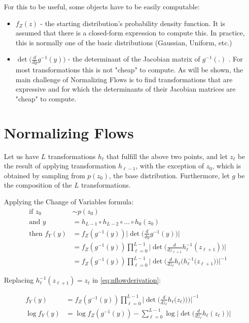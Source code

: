 For this to be useful, some objects have to be easily computable:
\begin{itemize}
    \item $f_Z(z)$ - the starting distribution's probability density function.
        It is assumed that there is a closed-form expression to compute this. In
        practice, this is normally one of the basic distributions (Gaussian,
        Uniform, etc.)
    \item $\det\Big(\frac{d}{dy}g^{-1}(y)\Big)$ - the determinant  of the Jacobian
        matrix of $g^{-1}(.)$ . For most transformations this is not "cheap" to compute.
        As will be shown, the main challenge of Normalizing Flows is to find
        transformations that are expressive and for which 
        the determinants of their Jacobian matrices are "cheap" to compute.
\end{itemize}

\section{Normalizing Flows}
Let us have $L$ transformations $h_\ell$ that fulfill the above two points, and
let $z_\ell$ be the result of applying transformation $h_{\ell-1}$, with the
exception of $z_0$, which is obtained by sampling from $p(z_0)$, the base distribution.
Furthermore, let $g$ be the composition of the $L$ transformations.

Applying the Change of Variables formula:
\begin{align}
    \mbox{if } z_0 &\sim p(z_0) \\
    \mbox{and } y &= h_{L-1} \circ h_{L-2} \circ ... \circ h_0(z_0) \\
    \mbox{then } f_Y(y) &= f_Z(g^{-1}(y))\Big|\det\Big(\frac{d}{dy}g^{-1}(y)\Big)\Big| \\
                        &= f_Z(g^{-1}(y))\prod_{\ell=0}^{L-1}\Big|\det\Big(\frac{d}{dz_{\ell+1}}h_{\ell}^{-1}(z_{\ell+1})\Big)\Big| \\
                        &= f_Z(g^{-1}(y))\prod_{\ell=0}^{L-1}\Big|\det\Big(\frac{d}{dz_{\ell}}h_{\ell}\Big(h_{\ell}^{-1}(z_{\ell+1}\Big)\Big)\Big|^{-1} \label{eq:nflowderivation}
\end{align}

Replacing $h_{\ell}^{-1}(z_{\ell+1}) = z_\ell$ in \ref{eq:nflowderivation}:

\begin{align}
         f_Y(y) &= f_Z(g^{-1}(y))\prod_{\ell=0}^{L-1}\Big|\det\Big(\frac{d}{dz_{\ell}}h_{\ell}\Big(z_\ell)\Big)\Big)\Big|^{-1} \\
    \log f_Y(y) &= \log f_Z(g^{-1}(y)) - \sum_{\ell=0}^{L-1} \log \Big|\det\Big(\frac{d}{dz_{\ell}}h_{\ell}(z_\ell)\Big) \Big| \label{eq:nflowsfinal}
\end{align}


